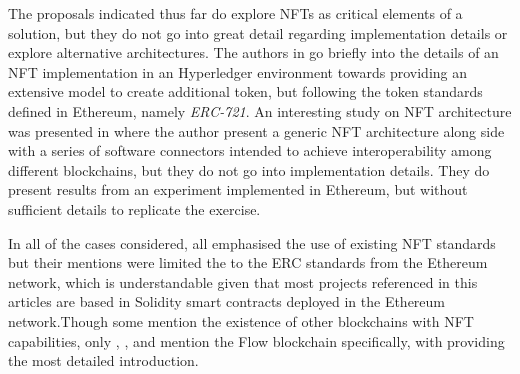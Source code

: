 \documentclass[../main.tex]{subfiles}
\begin{document}
\par
The proposals indicated thus far do explore NFTs as critical elements of a solution, but they do not go into great detail regarding implementation details or explore alternative architectures. The authors in \cite{Hong2019} go briefly into the details of an NFT implementation in an Hyperledger environment towards providing an extensive model to create additional token, but following the token standards defined in Ethereum, namely \textit{ERC-721}. An interesting study on NFT architecture was presented in \cite{Yang2022} where the author present a generic NFT architecture along side with a series of software connectors intended to achieve interoperability among different blockchains, but they do not go into implementation details. They do present results from an experiment implemented in Ethereum, but without sufficient details to replicate the exercise.
\par
In all of the cases considered, all emphasised the use of existing NFT standards but their mentions were limited the to the ERC standards from the Ethereum network, which is understandable given that most projects referenced in this articles are based in Solidity smart contracts deployed in the Ethereum network.Though some mention the existence of other blockchains with NFT capabilities, only \cite{Wang2021}, \cite{Razi2024}, and \cite{Guidi2023} mention the Flow blockchain specifically, with \cite{Guidi2023} providing the most detailed introduction.
\end{document}
